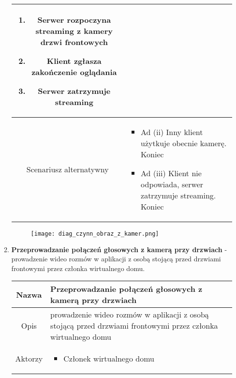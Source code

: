 \documentclass{article}
\begin{document}
\begin{enumerate}
\begin{enumerate}
\begin{table}[H]
\begin{tabular}{|c|p{7cm}|}
\begin{enumerate}
\item Serwer rozpoczyna streaming z kamery drzwi frontowych

\item Klient zgłasza zakończenie oglądania

\item Serwer zatrzymuje streaming\end{enumerate} \\
						\hline
						Scenariusz alternatywny & \begin{itemize}\item Ad (ii) Inny klient użytkuje obecnie kamerę. Koniec

\item Ad (iii) Klient nie odpowiada, serwer zatrzymuje streaming. Koniec\end{itemize}                                                                                     \\
						\hline
					\end{tabular}
				\end{table}

				\begin{figure}[h]
					\centering
					\texttt{[image: diag\_czynn\_obraz\_z\_kamer.png]}
				\end{figure}

			\item \textbf{Przeprowadzanie połączeń głosowych z kamerą przy drzwiach} -
				prowadzenie wideo rozmów w aplikacji z osobą stojącą przed drzwiami
				frontowymi przez członka wirtualnego domu.
				\begin{table}[H]
					\centering
					\begin{tabular}{|c|p{7cm}|}
						\hline
						Nazwa                   & \textbf{Przeprowadzanie połączeń głosowych z kamerą przy drzwiach}                                                                                                                                                                                                       \\
						\hline
						Opis                    & prowadzenie wideo rozmów w aplikacji z osobą stojącą przed drzwiami frontowymi przez członka wirtualnego domu                                                                                                                                                            \\
						\hline
						Aktorzy                 & \begin{itemize}\item Członek wirtualnego domu


\end{itemize}
\end{tabular}
\end{table}
\end{enumerate}
\end{enumerate}
\end{document}
